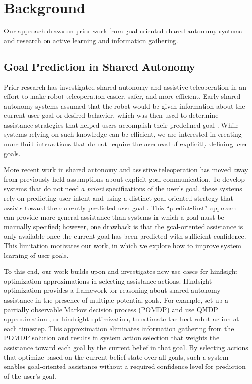 \documentclass[conference]{IEEEtran}
\begin{document}
\section{Background}

Our approach draws on prior work from goal-oriented shared autonomy systems and research on active learning and information gathering.

\subsection{Goal Prediction in Shared Autonomy}

Prior research has investigated shared autonomy and assistive teleoperation in an effort to make robot teleoperation easier, safer, and more efficient. Early shared autonomy systems assumed that the robot would be given information about the current user goal or desired behavior, which was then used to determine assistance strategies that helped users accomplish their predefined goal \cite{aigner1997human, debus2001cooperative, goodrich2001experiments}. While systems relying on such knowledge can be efficient, we are interested in creating more fluid interactions that do not require the overhead of explicitly defining user goals.

More recent work in shared autonomy and assistive teleoperation has moved away from previously-held assumptions about explicit goal communication. To develop systems that do not need \textit{a priori} specifications of the user's goal, these systems rely on predicting user intent and using a distinct goal-oriented strategy that assists toward the currently predicted user goal \cite{dragan2012formalizing, fagg2004extracting, kragic2005human, schultz2017goal, yu2005telemanipulation}. This ``predict-first'' approach can provide more general assistance than systems in which a goal must be manually specified; however, one drawback is that the goal-oriented assistance is only available once the current goal has been predicted with sufficient confidence. This limitation motivates our work, in which we explore how to improve system learning of user goals.

To this end, our work builds upon and investigates new use cases for hindsight optimization approximations in selecting assistance actions. Hindsight optimization provides a framework for reasoning about shared autonomy assistance in the presence of multiple potential goals. For example, \citet{javdani2015shared} set up a partially observable Markov decision process (POMDP) and use QMDP approximation \cite{littman1995learning}, or hindsight optimization, to estimate the best robot action at each timestep. This approximation eliminates information gathering from the POMDP solution and results in system action selection that weights the assistance toward each goal by the current belief in that goal. By selecting actions that optimize based on the current belief state over all goals, such a system enables goal-oriented assistance without a required confidence level for prediction of the user's goal.
\end{document}
